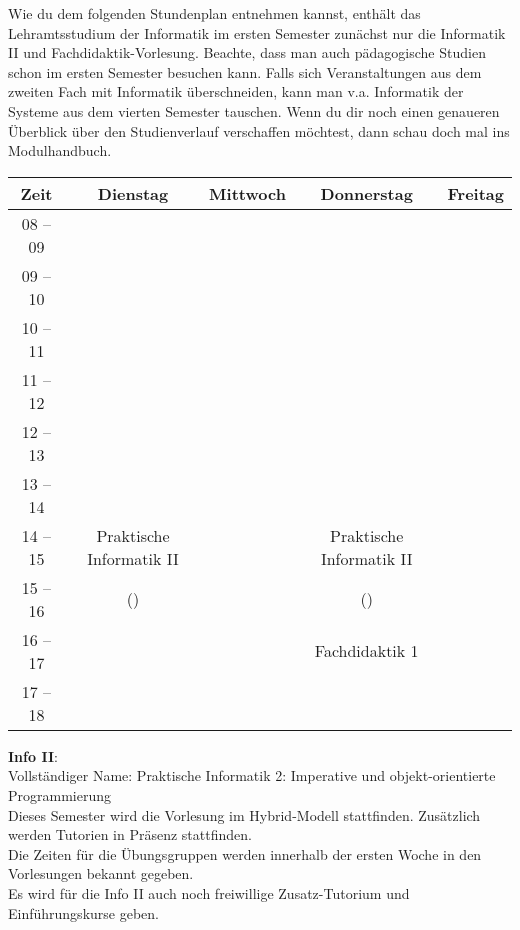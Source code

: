 Wie du dem folgenden Stundenplan entnehmen kannst, enthält das Lehramtsstudium der Informatik im ersten Semester zunächst nur die Informatik II und Fachdidaktik-Vorlesung.
Beachte, dass man auch pädagogische Studien schon im ersten Semester besuchen kann. Falls sich Veranstaltungen aus dem zweiten
Fach mit Informatik überschneiden, kann man v.a. Informatik der Systeme aus dem vierten Semester tauschen.
Wenn du dir noch einen genaueren Überblick über den Studienverlauf verschaffen möchtest, dann schau doch mal ins Modulhandbuch.

\begin{center}
	\begin{tabular}{|c|c|c|c|c|}
		\hline
		Zeit     & Dienstag                   & Mittwoch & Donnerstag                 & Freitag \\ \hline
		08 -- 09 &                            &          &                            &         \\ \hline
		09 -- 10 &                            &          &                            &         \\ \hline
		10 -- 11 &                            &          &                            &         \\ \hline
		11 -- 12 &                            &          &                            &         \\ \hline
		12 -- 13 &                            &          &                            &         \\ \hline
		13 -- 14 &                            &          &                            &         \\ \hline
		14 -- 15 & Praktische Informatik II   &          & Praktische Informatik II   &         \\ \cline{1-1}
		15 -- 16 & (\Infoprof)                &          & (\Infoprof) &         \\ \hline
		16 -- 17 &                            &          & Fachdidaktik 1             &         \\ \hline
		17 -- 18 &                            &          &                            &         \\ \hline
		\end{tabular}

\end{center}

\textbf{Info II}:\\
Vollständiger Name: Praktische Informatik 2: Imperative und objekt-orientierte Programmierung\\
Dieses Semester wird die Vorlesung im Hybrid-Modell stattfinden. Zusätzlich werden Tutorien in Präsenz stattfinden.\\

Die Zeiten für die Übungsgruppen werden innerhalb der ersten Woche in den Vorlesungen bekannt gegeben.\\
Es wird für die Info II auch noch freiwillige Zusatz-Tutorium und Einführungskurse geben. 

